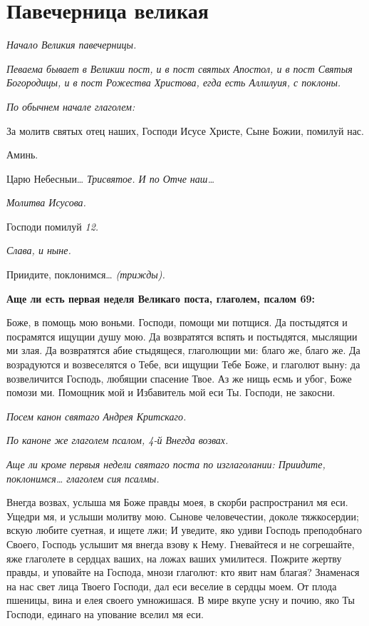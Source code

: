    

\section{Павечерница великая}



\itshape Начало Великия павечерницы. \normalfont{}


 \itshape Певаема бывает в Великии пост, и в пост святых Апостол, и в пост
Святыя Богородицы, и в пост Рожества Христова, егда есть Аллилуия, с
поклоны.\normalfont{}


 \itshape По обычнем начале глаголем:\normalfont{}


   За молитв святых отец наших, Господи Исусе Христе, Сыне Божии,
помилуй нас.


   Аминь.


   Царю Небесныи… \itshape Трисвятое\normalfont{}. \itshape И по\normalfont{} Отче наш…


 \itshape Молитва Исусова.\normalfont{}


   Господи помилуй \itshape 12\normalfont{}.


 \itshape Слава, и ныне\normalfont{}.


   Приидите, поклонимся… \itshape (трижды)\normalfont{}.






 

\bfseries Аще ли есть первая неделя Великаго поста, глаголем, псалом
69:\normalfont{}


   Боже, в помощь мою воньми. Господи, помощи ми потщися. Да
постыдятся и посрамятся ищущии душу мою. Да возвратятся вспять и
постыдятся, мыслящии ми злая. Да возвратятся абие стыдящеся,
глаголющии ми: благо же, благо же. Да возрадуются и возвеселятся о
Тебе, вси ищущии Тебе Боже, и глаголют выну: да возвеличится
Господь, любящии спасение Твое. Аз же нищь есмь и убог, Боже
помози ми. Помощник мой и Избавитель мой еси Ты. Господи, не
закосни.


 \itshape Посем канон святаго Андрея Критскаго.\normalfont{}


 \itshape По каноне же глаголем псалом, 4-й Внегда возвах.\normalfont{}


 \itshape Аще ли кроме первыя недели святаго поста по изглаголании:\normalfont{} Приидите,
поклонимся… \itshape глаголем сия псалмы.\normalfont{}


   Внегда возвах, услыша мя Боже правды моея, в скорби распространил мя
еси. Ущедри мя, и услыши молитву мою. Сынове человечестии, доколе
тяжкосердии; вскую любите суетная, и ищете лжи; И уведите, яко удиви
Господь преподобнаго Своего, Господь услышит мя внегда взову к Нему.
Гневайтеся и не согрешайте, яже глаголете в сердцах ваших, на ложах
ваших умилитеся. Пожрите жертву правды, и уповайте на Господа, мнози
глаголют: кто явит нам благая? Знаменася на нас свет лица Твоего Господи,
дал еси веселие в сердцы моем. От плода пшеницы, вина и елея своего
умножишася. В мире вкупе усну и почию, яко Ты Господи, единаго на
упование вселил мя еси.






